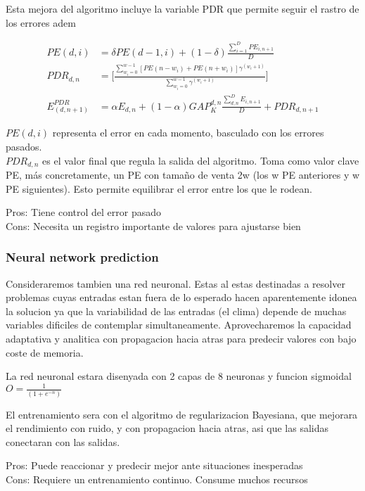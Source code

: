 Esta mejora del algoritmo incluye la variable PDR que permite seguir el rastro de los errores adem

\begin{align}
	PE(d,i) &= \delta PE(d-1,i) + (1-\delta) \frac  {\sum_{i=1}^D PE_{i,n+1}} {D} \\
	PDR_{d,n} &= \bigg[ \frac{\sum^{w-1}_{w_i = 0} [ PE(n-w_i) + PE(n+w_i) ] \gamma^{(w_i + 1)}}{\sum_{w_i = 0}^{w - 1} \gamma^{(w_i + 1)}} \bigg] \\
	E^{PDR}_(d,n+1) &= \alpha E_{d,n} + (1-\alpha ) GAP^{d,n}_K \frac{\sum^D_{d,n} E_{i,n+1} }{D} + PDR_{d,n+1}
\end{align}

$PE(d,i)$ representa el error en cada momento, basculado con los errores pasados. \\
$PDR_{d,n}$ es el valor final que regula la salida del algoritmo. Toma como valor clave PE, más concretamente, un PE con tamaño de venta 2w (los w PE anteriores y w PE siguientes). Esto permite equilibrar el error entre los que le rodean. 

Pros: Tiene control del error pasado \\
Cons: Necesita un registro importante de valores para ajustarse bien


\subsubsection{ Neural network prediction} 
\label{ssub:subsubsection_name}

Consideraremos tambien una red neuronal. Estas al estas destinadas a resolver problemas cuyas entradas estan fuera de lo esperado hacen aparentemente idonea la solucion ya que la variabilidad de las entradas (el clima) depende de muchas variables dificiles de contemplar simultaneamente.
Aprovecharemos la capacidad adaptativa y analitica con propagacion hacia atras para predecir valores con bajo coste de memoria.

La red neuronal estara disenyada con 2 capas de 8 neuronas y funcion sigmoidal $O = \frac{1}{(1+e^{-n})}$

El entrenamiento sera con el algoritmo de regularizacion Bayesiana, que mejorara el rendimiento con ruido, y con propagacion hacia atras, asi que las salidas conectaran con las salidas.

Pros: Puede reaccionar y predecir mejor ante situaciones inesperadas \\
Cons: Requiere un entrenamiento continuo. Consume muchos recursos


